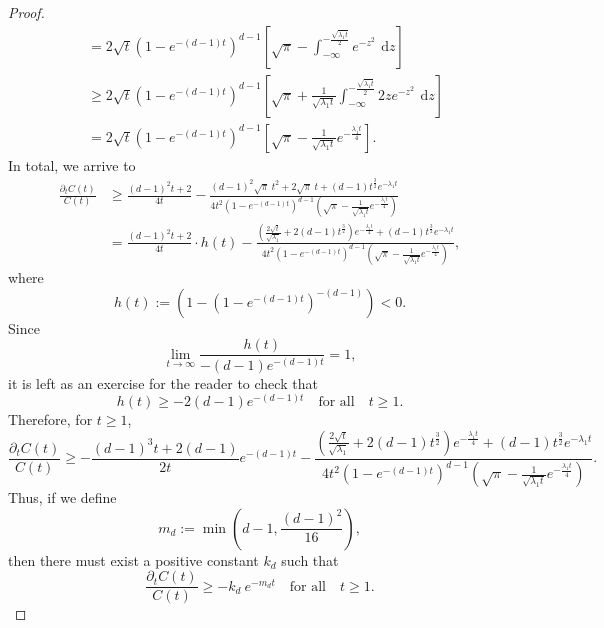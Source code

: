 \documentclass[12pt,longbibliography]{article}
\def\d{\,\mathrm{d}}
\def\d{\,\mathrm{d}}
\theoremstyle{definition}
\theoremstyle{remark}
\theoremstyle{example}
\begin{document}
\begin{proof}
\[\begin{aligned}
		&= 2\sqrt{t} \left(1- e^{-(d-1)t}\right)^{d-1}\left[\sqrt{\pi} - \int_{-\infty}^{-\frac{\sqrt{\lambda_1 t}}{2}}  e^{-z^2}\ \d z \right]\\[10pt]
		&\geq 2\sqrt{t} \left(1- e^{-(d-1)t}\right)^{d-1}\left[\sqrt{\pi} +\frac{1}{\sqrt{\lambda_1 t}} \int_{-\infty}^{-\frac{\sqrt{\lambda_1 t}}{2}} 2z e^{-z^2}\ \d z \right]\\[10pt]
		&= 2\sqrt{t} \left(1- e^{-(d-1)t}\right)^{d-1}\left[\sqrt{\pi} - \frac{1}{\sqrt{\lambda_1 t}}e^{-{\frac{\lambda_1 t}{4}}} \right].
	\end{aligned}
	\]
	In total, we arrive to
	\[
	\begin{aligned}
		\frac{\partial_t C(t)}{C(t)}&\geq \frac{(d-1)^2t+2}{4t} - \frac{(d-1)^2\sqrt{\pi}\ t^2  +2\sqrt{\pi}\ t  + (d-1)t^\frac{3}{2}e^{-\lambda_1 t}}{4t^2\left(1-e^{-(d-1)t}\right)^{d-1} \left(\sqrt{\pi} - \frac{1}{\sqrt{\lambda_1 t}}e^{-\frac{\lambda_1 t}{4}}\right)}\\[10pt]
		&=\frac{(d-1)^2t+2}{4t}\cdot h(t) - \frac{\left(\frac{2\sqrt{t}}{\sqrt{\lambda_1}}+2(d-1)t^{\frac{3}{2}}\right)e^{-\frac{\lambda_1 t}{4}} + (d-1)t^\frac{3}{2}e^{-\lambda_1 t} }{4t^2\left(1-e^{-(d-1)t}\right)^{d-1} \left(\sqrt{\pi} - \frac{1}{\sqrt{\lambda_1 t}}e^{-\frac{\lambda_1 t}{4}}\right)},
	\end{aligned}
	\]
	where
	\begin{equation}\label{eq:def_h(t)}
		h(t):= \left(1-\left(1-e^{-(d-1)t}\right)^{-(d-1)}\right)<0.
	\end{equation}
	Since
	\[
	\lim\limits_{t\to\infty} \frac{h(t)}{-(d-1)e^{-(d-1)t}} = 1,
	\]
	it is left as an exercise for the reader to check that 
	\[
	h(t)\geq -2(d-1)e^{-(d-1)t}\quad\text{for all}\quad t\geq 1.
	\]
	Therefore, for $t\geq 1$,
	\[
	\frac{\partial_t C(t)}{C(t)}\geq -\frac{(d-1)^3t+2(d-1)}{2t} e^{-(d-1)t} - \frac{\left(\frac{2\sqrt{t}}{\sqrt{\lambda_1}}+2(d-1)t^{\frac{3}{2}}\right)e^{-\frac{\lambda_1 t}{4}} + (d-1)t^\frac{3}{2}e^{-\lambda_1 t} }{4t^2\left(1-e^{-(d-1)t}\right)^{d-1} \left(\sqrt{\pi} - \frac{1}{\sqrt{\lambda_1 t}}e^{-\frac{\lambda_1 t}{4}}\right)}.
	\]
	Thus, if we define 
	\begin{equation}\label{eq:def_m_d}
		m_d := \min \left(d-1, \frac{(d-1)^2}{16}\right),
	\end{equation}
	then there must exist a positive constant $k_d$ such that
	\[
	\frac{\partial_t C(t)}{C(t)}\geq -k_d\ e^{-m_d t} \quad\text{for all}\quad t\geq 1.
	\]
	

\end{proof}
\end{document}
